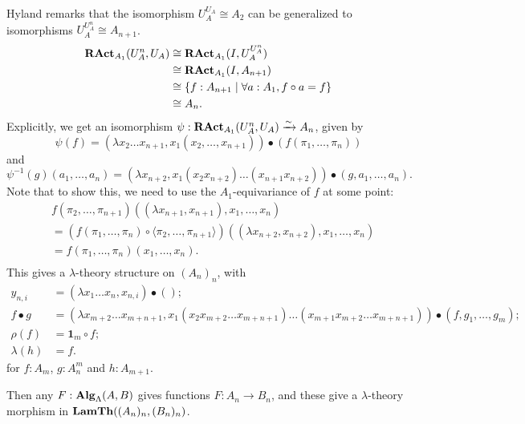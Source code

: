 \begin{remark}
  Hyland remarks that the isomorphism $ U_A^{U_A} \cong A_2 $ can be generalized to isomorphisms $ U_A^{U_A^n} \cong A_{n + 1} $.
  \begin{align*}
    \mathbf{RAct}_{A_1}(U_A^n, U_A)
    &\cong \mathbf{RAct}_{A_1}(I, U_A^{U_A^n})\\
    &\cong \mathbf{RAct}_{A_1}(I, A_{n + 1})\\
    &\cong \{ f : A_{n + 1} \mid \forall a : A_1, f \circ a = f \}\\
    &\cong A_n.
  \end{align*}
  Explicitly, we get an isomorphism $ \psi: \mathbf{RAct}_{A_1}(U_A^n, U_A) \xrightarrow \sim A_n $, given by
  \[ \psi(f) = (\lambda x_2 \dots x_{n + 1}, x_1 (x_2, \dots, x_{n + 1})) \bullet (f (\pi_1, \dots, \pi_n)) \]
  and
  \[ \psi^{-1}(g)(a_1, \dots, a_n) = (\lambda x_{n + 2}, x_1 (x_2 x_{n + 2}) \dots (x_{n + 1} x_{n + 2})) \bullet (g, a_1, \dots, a_n). \]
  Note that to show this, we need to use the $ A_1 $-equivariance of $ f $ at some point:
  \begin{align*}
    &f(\pi_2, \dots, \pi_{n + 1})((\lambda x_{n + 1}, x_{n + 1}), x_1, \dots, x_n)\\
    &= (f(\pi_1, \dots, \pi_n) \circ \langle \pi_2, \dots, \pi_{n + 1} \rangle) ((\lambda x_{n + 2}, x_{n + 2}), x_1, \dots, x_n)\\
    &= f(\pi_1, \dots, \pi_n) (x_1, \dots, x_n).\\
  \end{align*}
  This gives a $ \lambda $-theory structure on $ (A_n)_n $, with
  \begin{align*}
    y_{n, i} &= (\lambda x_1 \dots x_n, x_{n, i}) \bullet ();\\
    f \bullet g &= (\lambda x_{m + 2} \dots x_{m + n + 1}, x_1 (x_2 x_{m + 2} \dots x_{m + n + 1}) \dots (x_{m + 1} x_{m + 2} \dots x_{m + n + 1})) \bullet (f, g_1, \dots, g_m);\\
    \rho(f) &= \mathbf 1_m \circ f;\\
    \lambda(h) &= f.
  \end{align*}
  for $ f: A_m $, $ g: A_n^m $ and $ h: A_{m + 1} $.

  Then any $ F: \mathbf{Alg}_{\Lambda}(A, B) $ gives functions $ F: A_n \to B_n $, and these give a $ \lambda $-theory morphism in $ \mathbf{LamTh}((A_n)_n, (B_n)_n) $.


\end{remark}
